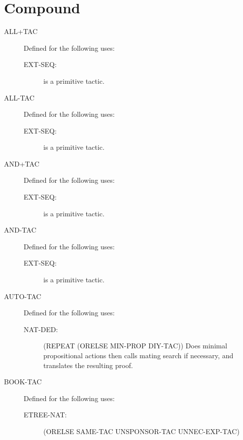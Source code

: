 \section{Compound}

\begin{description} 
\item[ALL+TAC]  Defined for the following uses:
\begin{description}
\item[EXT-SEQ:]  is a primitive tactic.

\end{description}

\item[ALL-TAC]  Defined for the following uses:
\begin{description}
\item[EXT-SEQ:]  is a primitive tactic.

\end{description}

\item[AND+TAC]  Defined for the following uses:
\begin{description}
\item[EXT-SEQ:]  is a primitive tactic.

\end{description}

\item[AND-TAC]  Defined for the following uses:
\begin{description}
\item[EXT-SEQ:]  is a primitive tactic.

\end{description}

\item[AUTO-TAC]  Defined for the following uses:
\begin{description}
\item[NAT-DED:] 
(REPEAT (ORELSE MIN-PROP DIY-TAC))
Does minimal propositional actions then calls mating search if
necessary, and translates the resulting proof.

\end{description}

\item[BOOK-TAC]  Defined for the following uses:
\begin{description}
\item[ETREE-NAT:] 
(ORELSE SAME-TAC UNSPONSOR-TAC UNNEC-EXP-TAC)



\end{description}
\end{description}
